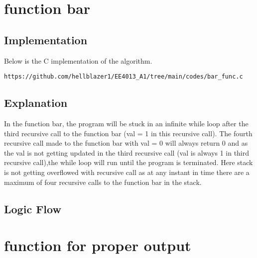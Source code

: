 \documentclass[journal,12pt,twocolumn]{IEEEtran}
\begin{document}
\section{function bar}

\subsection{Implementation}
Below is the C implementation of the algorithm.
\begin{lstlisting}
https://github.com/hellblazer1/EE4013_A1/tree/main/codes/bar_func.c
\end{lstlisting}

\subsection{Explanation}
In the function bar, the program will be stuck in an infinite while loop after the third recursive call to the function bar (val = 1 in this recursive call). The fourth recursive call made to the function bar with val = 0 will always return 0 and as the val is not getting updated in the third recursive call (val is always 1 in third recursive call),the while loop will run until the program is terminated. Here stack is not getting overflowed with recursive call as at any instant in time there are a maximum of four recursive calls to the function bar in the stack. 


\subsection{Logic Flow}

\begin{figure}[!h]
\centering
{}
\end{figure}


\section{function for proper output}
\end{document}
